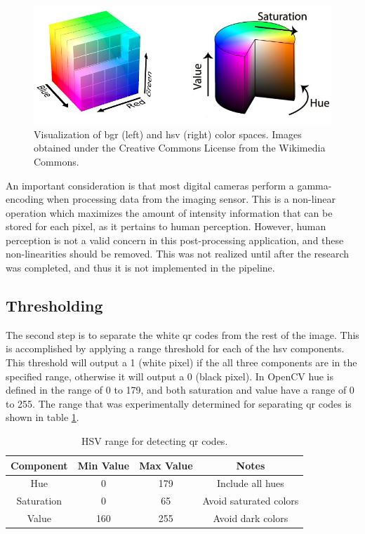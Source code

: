 \begin{figure}
	\centering
    \includegraphics[width=5.5in]{figures/bgr_and_hsv.jpg}
    \caption[BGR and HSV color spaces]{Visualization of \ac{bgr} (left) and \ac{hsv} (right) color spaces. Images obtained under the Creative Commons License from the Wikimedia Commons.}
    \label{figure:color_spaces}
\end{figure} 

An important consideration is that most digital cameras perform a gamma-encoding when processing data from the imaging sensor.  This is a non-linear operation which maximizes the amount of intensity information that can be stored for each pixel, as it pertains to human perception.  However, human perception is not a valid concern in this post-processing application, and these non-linearities should be removed.  This was not realized until after the research was completed, and thus it is not implemented in the pipeline.

\subsection{Thresholding}
\label{section:qr_thresholding}

The second step is to separate the white \ac{qr} codes from the rest of the image.  This is accomplished by applying a range threshold for each of the \ac{hsv} components.  This threshold will output a 1 (white pixel) if the all three components are in the specified range, otherwise it will output a 0 (black pixel).  In OpenCV hue is defined in the range of 0 to 179, and both saturation and value have a range of 0 to 255.  The range that was experimentally determined for separating \ac{qr} codes is shown in table \ref{table:qr_hsv_ranges}.

\begin{table}
    \begin{center}
    \caption[QR code detection values]{HSV range for detecting \ac{qr} codes.}
    \begin{tabular}[c]{|c|c|c|c|}
        \hline
        Component & Min Value & Max Value & Notes \\
        \hline
        Hue        & 0   & 179 & Include all hues      \\
        Saturation & 0   & 65  & Avoid saturated colors  \\
        Value      & 160 & 255 & Avoid dark colors       \\
        \hline
    \end{tabular}
    \label{table:qr_hsv_ranges}
   \end{center}
\end{table}


